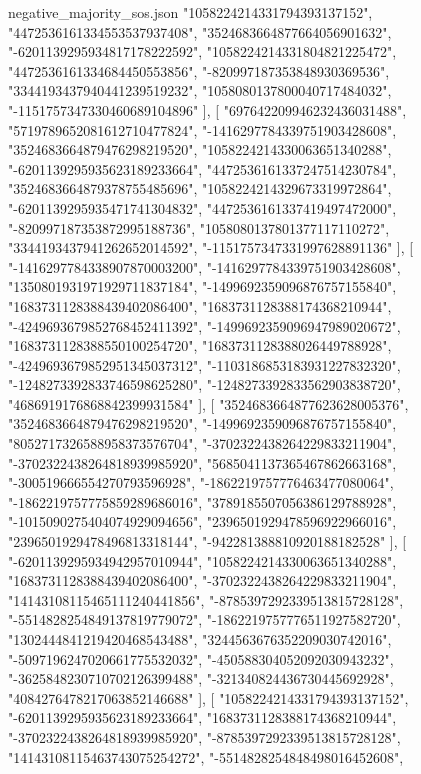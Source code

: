 \begin{filecontents*}[overwrite]{negative_majority_sos.json}
    "1058224214331794393137152",
    "4472536161334553537937408",
    "3524683664877664056901632",
    "-6201139295934817178222592",
    "1058224214331804821225472",
    "4472536161334684450553856",
    "-820997187353848930369536",
    "3344193437940441239519232",
    "1058080137800040717484032",
    "-1151757347330460689104896"
   ],
   [
    "697642209946232436031488",
    "5719789652081612710477824",
    "-1416297784339751903428608",
    "3524683664879476298219520",
    "1058224214330063651340288",
    "-6201139295935623189233664",
    "4472536161337247514230784",
    "3524683664879378755485696",
    "1058224214329673319972864",
    "-6201139295935471741304832",
    "4472536161337419497472000",
    "-820997187353872995188736",
    "1058080137801377117110272",
    "3344193437941262652014592",
    "-1151757347331997628891136"
   ],
   [
    "-1416297784338907870003200",
    "-1416297784339751903428608",
    "1350801931971929711837184",
    "-1499692359096876757155840",
    "1683731128388439402086400",
    "1683731128388174368210944",
    "-4249693679852768452411392",
    "-1499692359096947989020672",
    "1683731128388550100254720",
    "1683731128388026449788928",
    "-4249693679852951345037312",
    "-1103186853183931227832320",
    "-1248273392833746598625280",
    "-1248273392833562903838720",
    "4686919176868842399931584"
   ],
   [
    "3524683664877623628005376",
    "3524683664879476298219520",
    "-1499692359096876757155840",
    "8052717326588958373576704",
    "-3702322438264229833211904",
    "-3702322438264818939985920",
    "5685041137365467862663168",
    "-300519666554270793596928",
    "-1862219757776463477080064",
    "-1862219757775859289686016",
    "3789185507056386129788928",
    "-1015090275404074929094656",
    "2396501929478596922966016",
    "2396501929478496813318144",
    "-942281388810920188182528"
   ],
   [
    "-6201139295934942957010944",
    "1058224214330063651340288",
    "1683731128388439402086400",
    "-3702322438264229833211904",
    "14143108115465111240441856",
    "-8785397292339513815728128",
    "-5514828254849137819779072",
    "-1862219757776511927582720",
    "1302444841219420468543488",
    "3244563676352209030742016",
    "-5097196247020661775532032",
    "-450588304052092030943232",
    "-3625848230710702126399488",
    "-321340824436730445692928",
    "4084276478217063852146688"
   ],
   [
    "1058224214331794393137152",
    "-6201139295935623189233664",
    "1683731128388174368210944",
    "-3702322438264818939985920",
    "-8785397292339513815728128",
    "14143108115463743075254272",
    "-5514828254848498016452608",

\end{filecontents*}
